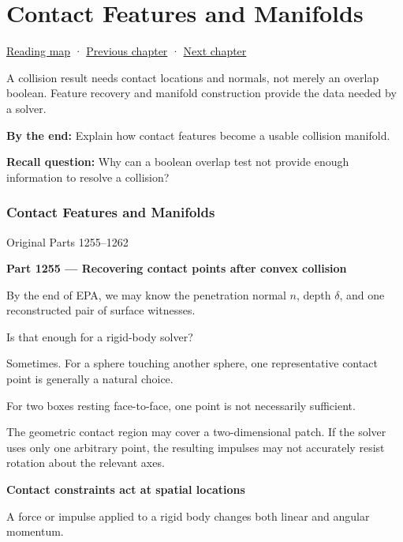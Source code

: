 \hypertarget{04-visual-computing-ii-ch026}{}
\chapter{Contact Features and Manifolds}\label{stagechapter:04-visual-computing-ii-ch026}\label{04-visual-computing-ii-ch026-contact-features-and-manifolds}

\hyperref[volume-reading-map]{Reading map} · \hyperref[04-visual-computing-ii-ch025-sat-for-triangle-and-convex-polygon-tests]{Previous chapter} · \hyperref[04-visual-computing-ii-ch027-mesh-queries-classification-and-clipping]{Next chapter}

A collision result needs contact locations and normals, not merely an overlap boolean. Feature recovery and manifold construction provide the data needed by a solver.

\textbf{By the end:} Explain how contact features become a usable collision manifold.

\textbf{Recall question:} Why can a boolean overlap test not provide enough information to resolve a collision?

\subsection{Contact Features and Manifolds}\label{04-visual-computing-ii-ch026-contact-features-and-manifolds-1}

Original Parts 1255--1262

\textbf{Part 1255 --- Recovering contact points after convex collision}

By the end of EPA, we may know the penetration normal \(n\), depth \(\delta\), and one reconstructed pair of surface witnesses.

Is that enough for a rigid-body solver?

Sometimes. For a sphere touching another sphere, one representative contact point is generally a natural choice.

For two boxes resting face-to-face, one point is not necessarily sufficient.

The geometric contact region may cover a two-dimensional patch. If the solver uses only one arbitrary point, the resulting impulses may not accurately resist rotation about the relevant axes.

\textbf{Contact constraints act at spatial locations}

A force or impulse applied to a rigid body changes both linear and angular momentum.

